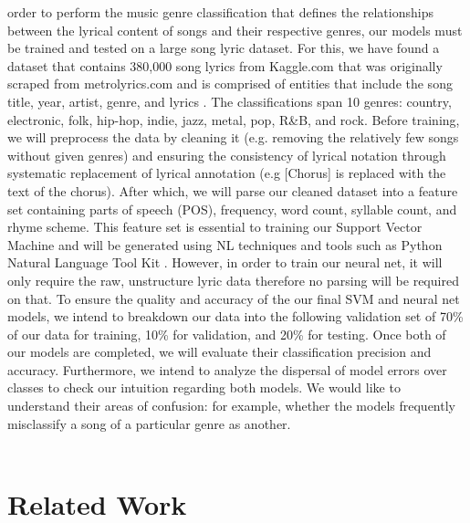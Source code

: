 \documentclass[journal]{IEEEtran}
\begin{document}
     order to perform the music genre classification that defines the relationships between the lyrical content of songs and their respective genres, our models must be trained and tested on a large song lyric dataset. For this, we have found a dataset that contains 380,000 song lyrics from Kaggle.com that was originally scraped from metrolyrics.com and is comprised of entities that include the song title, year, artist, genre, and lyrics  \cite{KaggleDataset}. The classifications span 10 genres: country, electronic, folk, hip-hop, indie, jazz, metal, pop, R\&B, and rock. Before training, we will preprocess the data by cleaning it (e.g. removing the relatively few songs without given genres) and ensuring the consistency of lyrical notation through systematic replacement of lyrical annotation (e.g [Chorus] is replaced with the text of the chorus). After which, we will parse our cleaned dataset into a feature set containing parts of speech (POS), frequency, word count, syllable count, and rhyme scheme. This feature set is essential to training our Support Vector Machine and will be generated using NL techniques and tools such as Python Natural Language Tool Kit \cite{NLTK}. However, in order to train our neural net, it will only require the raw, unstructure lyric data therefore no parsing will be required on that. To ensure the quality and accuracy of the our final SVM and neural net models, we intend to breakdown our data into the following validation set of 70\% of our data for training, 10\% for validation, and 20\% for testing. Once both of our models are completed, we will evaluate their classification precision and accuracy. Furthermore, we intend to analyze the dispersal of model errors over classes to check our intuition regarding both models. We would like to understand their areas of confusion: for example, whether the models frequently misclassify a song of a particular genre as another. \\ \\ \par 



\section{Related Work}
\end{document}
